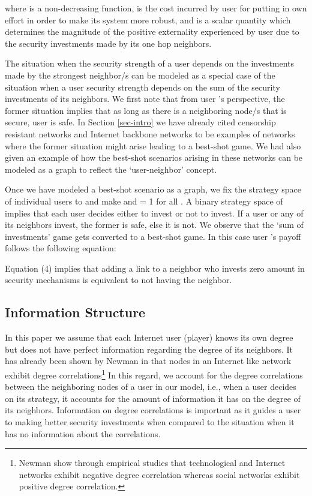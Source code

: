 \documentclass[letterpaper,12pt,onecolumn, nodraft]{IEEEtran}
\begin{document}
where  is a non-decreasing function,  is the cost incurred by user  for putting in own effort in order to make its system more robust, and  is a scalar quantity which determines the magnitude of the positive externality experienced by user  due to the security investments made by its one hop neighbors.  
  
The situation when the security strength of a user depends on the investments made by the strongest neighbor/s can be modeled as a special case of the situation when a user security strength depends on the sum of the security investments of its neighbors. We first note that from user 's perspective, the former situation implies that as long as there is a neighboring node/s that is secure, user  is safe. In Section \ref{sec-intro} we have already cited censorship resistant networks and Internet backbone networks to be examples of networks where the former situation might arise leading to a best-shot game. We had also given an example of how the best-shot scenarios arising in these networks can be modeled as a graph to reflect the `user-neighbor' concept.

Once we have modeled a best-shot scenario as a graph, we fix the strategy space of individual users to  and make  and  = 1 for all . A binary strategy space of  implies that each user decides either to invest or not to invest. If a user or any of its neighbors invest, the former is safe, else it is not. We observe that the `sum of investments' game gets converted to a best-shot game. In this case user 's payoff follows the following equation:

Equation (4) implies that adding a link to a neighbor who invests zero amount in security mechanisms is equivalent to not having the neighbor.  

\subsection{Information Structure} \label{sec-is}
In this paper we assume that each Internet user (player) knows its own degree but does not have perfect information regarding the degree of its neighbors. It has already been shown by Newman in \cite{newman2} that nodes in an Internet like network exhibit degree correlations\footnote{Newman show through empirical studies that technological and Internet networks exhibit negative degree correlation whereas social networks exhibit positive degree correlation.} In this regard, we account for the degree correlations between the neighboring nodes of a user  in our model, i.e., when a user decides on its strategy, it accounts for the amount of information it has on the degree of its neighbors. Information on degree correlations is important as it guides a user to making better security investments when compared to the situation when it has no information about the correlations.   
\end{document}
